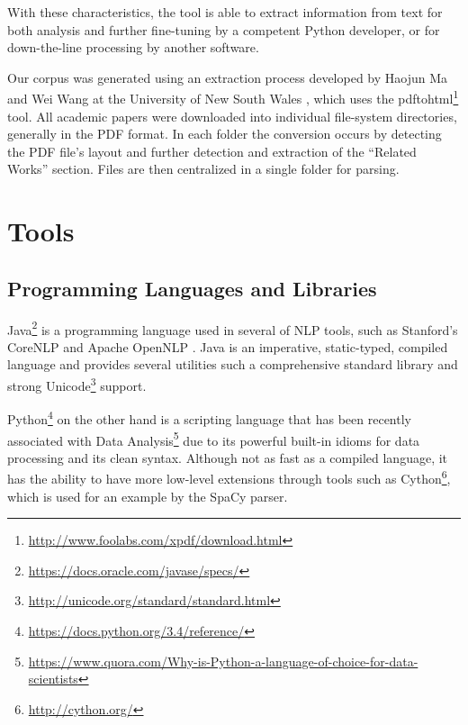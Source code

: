 \documentclass[11pt,a4paper,openright]{memoir}
\begin{document}
With these characteristics, the tool is able to extract information from text for both analysis and further fine-tuning by a competent Python developer, or for down-the-line processing by another software.

Our corpus was generated using an extraction process developed by Haojun Ma and Wei Wang at the University of New South Wales \cite{pdf-extraction}, which uses the pdftohtml\footnote{\url{http://www.foolabs.com/xpdf/download.html}} tool. All academic papers were downloaded into individual file-system directories, generally in the PDF \cite{pdf} format. In each folder the conversion occurs by detecting the PDF file's layout and further detection and extraction of the \enquote{Related Works} section. Files are then centralized in a single folder for parsing.


%
%
%
%


\section{Tools}
\label{section:tools}

\subsection{Programming Languages and Libraries}

Java\footnote{\url{https://docs.oracle.com/javase/specs/}} is a programming language used in several of NLP tools, such as Stanford's CoreNLP \cite{manning-EtAl:2014:P14-5} and Apache OpenNLP \cite{open-nlp}. Java is an imperative, static-typed, compiled language and provides several utilities such a comprehensive standard library and strong Unicode\footnote{\url{http://unicode.org/standard/standard.html}} support. 

Python\footnote{\url{https://docs.python.org/3.4/reference/}} on the other hand is a scripting language that has been recently associated with Data Analysis\footnote{\url{https://www.quora.com/Why-is-Python-a-language-of-choice-for-data-scientists}} due to its powerful built-in idioms for data processing and its clean syntax. Although not as fast as a compiled language, it has the ability to have more low-level extensions through tools such as Cython\footnote{\url{http://cython.org/}}, which is used for an example by the SpaCy \cite{honnibal-johnson:2015:EMNLP, spacy} parser.
\end{document}
